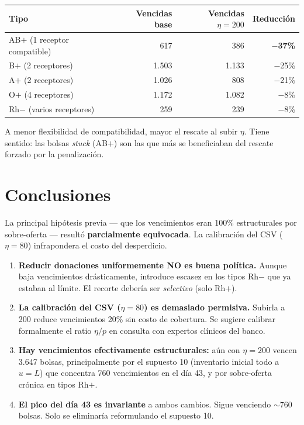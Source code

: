 \documentclass[11pt, a4paper]{article}
\begin{document}
\begin{center}
\begin{tabular}{lrrr}
\toprule
\rowcolor{rowgray}\textbf{Tipo} & \textbf{Vencidas base} & \textbf{Vencidas $\eta=200$} & \textbf{Reducción}\\
\midrule
AB$+$ (1 receptor compatible) & 617 & 386 & \textbf{$-$37\%} \\
B$+$ (2 receptores) & 1.503 & 1.133 & $-$25\% \\
A$+$ (2 receptores) & 1.026 & 808 & $-$21\% \\
O$+$ (4 receptores) & 1.172 & 1.082 & $-$8\% \\
Rh$-$ (varios receptores) & 259 & 239 & $-$8\% \\
\bottomrule
\end{tabular}
\end{center}

A menor flexibilidad de compatibilidad, mayor el rescate al subir $\eta$. Tiene sentido: las bolsas \emph{stuck} (AB$+$) son las que más se beneficiaban del rescate forzado por la penalización.

\section{Conclusiones}

\begin{nota}
La principal hipótesis previa --- que los vencimientos eran 100\% estructurales por sobre-oferta --- resultó \textbf{parcialmente equivocada}. La calibración del CSV ($\eta = 80$) infrapondera el costo del desperdicio.
\end{nota}

\begin{enumerate}[leftmargin=*, itemsep=4pt]
  \item \textbf{Reducir donaciones uniformemente NO es buena política.} Aunque baja vencimientos drásticamente, introduce escasez en los tipos Rh$-$ que ya estaban al límite. El recorte debería ser \emph{selectivo} (solo Rh$+$).
  \item \textbf{La calibración del CSV ($\eta = 80$) es demasiado permisiva.} Subirla a 200 reduce vencimientos 20\% sin costo de cobertura. Se sugiere calibrar formalmente el ratio $\eta/p$ en consulta con expertos clínicos del banco.
  \item \textbf{Hay vencimientos efectivamente estructurales:} aún con $\eta = 200$ vencen 3.647 bolsas, principalmente por el supuesto 10 (inventario inicial todo a $u=L$) que concentra 760 vencimientos en el día 43, y por sobre-oferta crónica en tipos Rh$+$.
  \item \textbf{El pico del día 43 es invariante} a ambos cambios. Sigue venciendo $\sim$760 bolsas. Solo se eliminaría reformulando el supuesto 10.
\end{enumerate}
\end{document}
